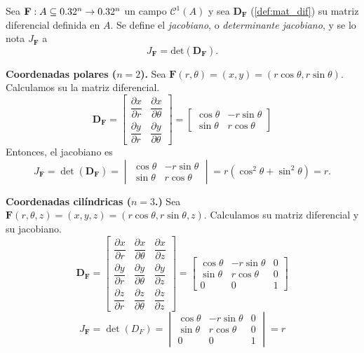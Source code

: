 \begin{definition}
    Sea $\mathbf{F}:A\subseteq0.32^n\to0.32^n$ un campo $\mathcal{C}^1(A)$ y sea $\boldsymbol{D}_\mathbf{F}$ (\autoref{def:mat_dif}) su matriz diferencial definida en $A$. Se define el \emph{jacobiano}, o \emph{determinante jacobiano}, y se lo nota $J_\mathbf{F}$ a 
    \[
        J_\mathbf{F}=\text{det}(\boldsymbol{D}_\mathbf{F}).
    \]
\end{definition}


\begin{example} \textbf{Coordenadas polares (\(n = 2\)).} Sea \( \mathbf{F}(r, \theta) = (x,y)= (r\cos\theta, r\sin\theta) \). Calculamos su la matriz diferencial.
       \[
       \boldsymbol{D}_{\mathbf{F}} = \begin{bmatrix}
       \dfrac{\partial x}{\partial r} & \dfrac{\partial x}{\partial \theta} \\[.4cm]
       \dfrac{\partial y}{\partial r} & \dfrac{\partial y}{\partial \theta}
       \end{bmatrix}
       =
       \begin{bmatrix}
       \cos\theta & -r\sin\theta \\
       \sin\theta & r\cos\theta
       \end{bmatrix}
       \]
       Entonces, el jacobiano es
       \[
       J_{\mathbf{F}} = \det(\boldsymbol{D}_{\mathbf{F}}) = 
       \begin{vmatrix}
       \cos\theta & -r\sin\theta \\
       \sin\theta & r\cos\theta
       \end{vmatrix}
       = r(\cos^2\theta + \sin^2\theta) = r.
       \]
   \end{example}
   
   \begin{example} \textbf{Coordenadas cilíndricas (\(n = 3\).)}
       Sea \( \mathbf{F}(r, \theta, z) = (x, y, z) = (r\cos\theta, r\sin\theta, z) \). Calculamos su matriz diferencial y su jacobiano.
   \[
    \boldsymbol{D}_{\mathbf{F}}=
   \begin{bmatrix}
   \dfrac{\partial x}{\partial r} & \dfrac{\partial x}{\partial \theta} & \dfrac{\partial x}{\partial z} \\[.4cm]
   \dfrac{\partial y}{\partial r} & \dfrac{\partial y}{\partial \theta} & \dfrac{\partial y}{\partial z} \\[.4cm]
   \dfrac{\partial z}{\partial r} & \dfrac{\partial z}{\partial \theta} & \dfrac{\partial z}{\partial z}
   \end{bmatrix}
   =
   \begin{bmatrix}
   \cos\theta & -r\sin\theta & 0 \\
   \sin\theta & r\cos\theta & 0 \\
   0 & 0 & 1
   \end{bmatrix}
   \]   
   \[
   J_\mathbf{F} = \det(D_F) = 
   \begin{vmatrix}
   \cos\theta & -r\sin\theta & 0 \\
   \sin\theta & r\cos\theta & 0 \\
   0 & 0 & 1
   \end{vmatrix}
   = r
   \]
   \end{example}
   
